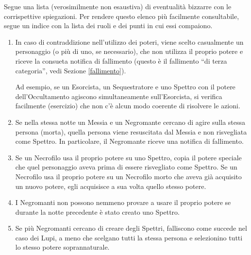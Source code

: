 \documentclass[a4paper,10pt]{article}
\begin{document}
Segue una lista (verosimilmente non esaustiva) di eventualità bizzarre con le corrispettive spiegazioni.
Per rendere questo elenco più facilmente consultabile, segue un indice con la lista dei ruoli e dei punti in cui essi compaiono.

\begin{enumerate}
 
 \item In caso di contraddizione nell'utilizzo dei poteri, viene scelto casualmente un personaggio (o più di uno, se necessario), che non utilizza il proprio potere e riceve la consueta notifica di fallimento (questo è il fallimento ``di terza categoria'', vedi Sezione \ref{fallimento}).
 
 Ad esempio, se un Esorcista, un Sequestratore e uno Spettro con il potere dell'Occultamento agiscono simultaneamente sull'Esorcista, si verifica facilmente (esercizio) che non c'è alcun modo coerente di risolvere le azioni.
 
 \item Se nella stessa notte un Messia e un Negromante cercano di agire sulla stessa persona (morta), quella persona viene resuscitata dal Messia e non risvegliata come Spettro. In particolare, il Negromante riceve una notifica di fallimento.

 \item Se un Necrofilo usa il proprio potere su uno Spettro, copia il potere speciale che quel personaggio aveva prima di essere risvegliato come Spettro.
 Se un Necrofilo usa il proprio potere su un Necrofilo morto che aveva già acquisito un nuovo potere, egli acquisisce a sua volta quello stesso potere.
 
 \item I Negromanti non possono nemmeno provare a usare il proprio potere se durante la notte precedente è stato creato uno Spettro.
 
 \item Se più Negromanti cercano di creare degli Spettri, falliscono come succede nel caso dei Lupi, a meno che scelgano tutti la stessa persona e selezionino tutti lo stesso potere soprannaturale.


\end{enumerate}
\end{document}
